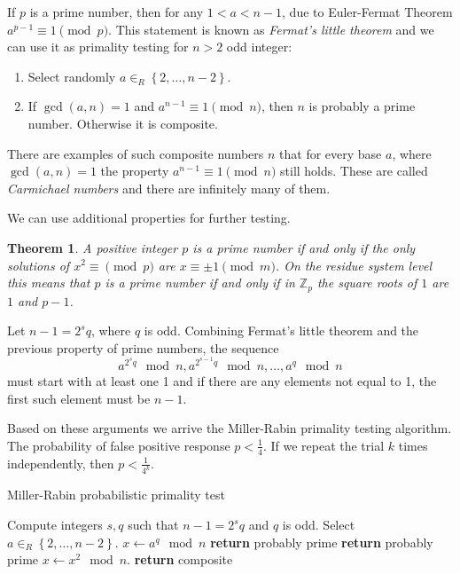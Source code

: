 \documentclass{article}
\newcommand{\Z}{\mathbb{Z}}
\newtheorem{theorem}{Theorem}
\begin{document}
If $p$ is a prime number, then for any $1 < a < n-1$, due to Euler-Fermat Theorem $a^{p-1} \equiv 1 \pmod{p}$.
This statement is known as \emph{Fermat's little theorem} and we can use it as primality testing for $n > 2$ odd integer:
\begin{enumerate}
    \item Select randomly $a \in_R \left \{ 2, \ldots, n-2 \right \}$.
    \item If $\gcd(a,n)=1$ and $a^{n-1} \equiv 1 \pmod{n}$, then $n$ is probably a prime number. Otherwise it is composite.
\end{enumerate}

There are examples of such composite numbers $n$ that for every base $a$, where $\gcd(a,n)=1$ the property $a^{n-1} \equiv 1 \pmod{n}$ still holds.
These are called \emph{Carmichael numbers} and there are infinitely many of them.

We can use additional properties for further testing.

\begin{theorem}
    A positive integer $p$ is a prime number if and only if the only solutions of $x^2 \equiv \pmod{p}$ are $x \equiv \pm 1 \pmod{m}$.
    On the residue system level this means that $p$ is a prime number if and only if in $\Z_p$ the square roots of $1$ are $1$ and $p-1$.
\end{theorem}

Let $n-1 = 2^s q$, where $q$ is odd. Combining Fermat's little theorem and the previous property of prime numbers, the sequence
\[
    a^{2^s q} \mod n, a^{2^{s-1} q} \mod n, \ldots, a^q \mod n
\]
must start with at least one 1 and if there are any elements not equal to 1, the first such element must be $n-1$.

Based on these arguments we arrive the Miller-Rabin primality testing algorithm.
The probability of false positive response $p < \frac{1}{4}$. If we repeat the trial $k$ times independently, then $p < \frac{1}{4^k}$.

\begin{algorithm}
    \caption{Miller-Rabin probabilistic primality test}
    \label{alg:miller-rabin}
    \begin{algorithmic}[1]
            \State Compute integers $s, q$ such that $n-1=2^s q$ and $q$ is odd.
            \State Select $a \in_R \left \{ 2,\ldots,n-2 \right \}$.
            \State $x \gets a^q \mod n$ 
                \State \textbf{return} probably prime
            \EndIf
                    \State \textbf{return} probably prime
                \EndIf
                \State $x \gets x^2 \mod n$.
            \EndFor
            \State \textbf{return} composite
        \EndProcedure
    \end{algorithmic}
\end{algorithm}
\end{document}
